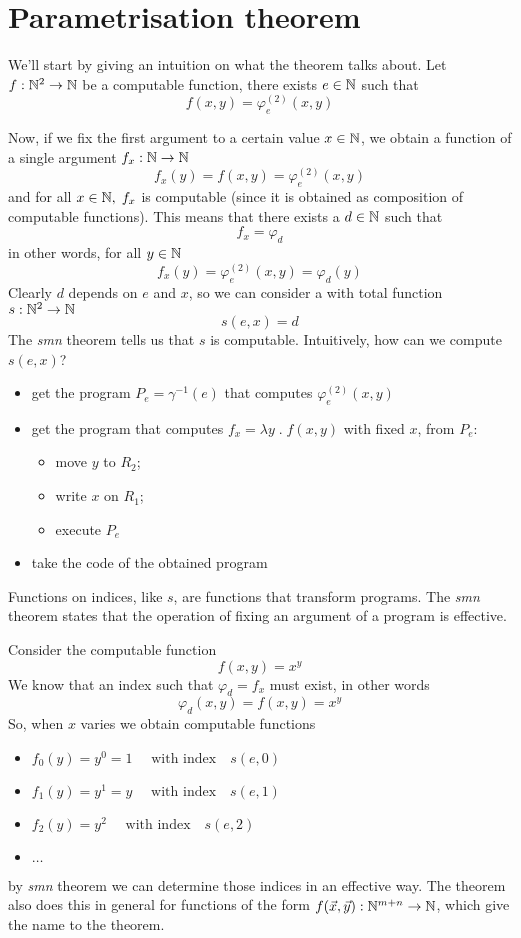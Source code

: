 \chapter {Parametrisation theorem}
\newcommand{\smn}{$S_n^m$}

We'll start by giving an intuition on what the theorem talks
about. Let $f : \mathbb{N}^2 \rightarrow \mathbb{N}$ be a computable
function, there exists $e \in \mathbb{N}$ such that
 \[f(x,y) = \varphi_e^{(2)}(x,y)\]

Now, if we fix the first argument to a certain value $x \in \mathbb{N}$, we obtain a
function of a single argument $f_x : \mathbb{N} \to \mathbb{N}$
\[f_x(y) = f(x,y) = \varphi_e^{(2)}(x,y)\] and for all $ x \in \mathbb{N}, \; f_x$
is computable (since it is obtained as composition of computable
functions). This means that there exists a $d \in \mathbb{N}$ such that
\[f_x = \varphi_d\] in other words, for all $ y \in \mathbb{N}$
\[f_x(y) = \varphi_e^{(2)}(x,y) = \varphi_d(y)\] Clearly $d$
depends on $e$ and $x$, so we can consider a with 
total function $s : \mathbb{N}^2 \rightarrow \mathbb{N}$
\[
  s(e, x) = d
  \]
The \textit{smn} theorem tells us that $s$ is computable. Intuitively,
how can we compute $s(e, x)$?
\begin{itemize}
\item get the program
  $P_e = \gamma^{-1}(e)$ that computes $\varphi_e^{(2)}(x,y)$
\item get the program that computes $f_x = \lambda y \; . \; f(x,y)$ with
  fixed $x$, from $P_e$:
  \begin{itemize}
  \item move $y$ to $R_2$;
  \item write $x$ on $R_1$;
  \item execute $P_e$
  \end{itemize}
\item take the code of the obtained program
\end{itemize}
Functions on indices, like $s$, are functions that
transform programs. The \emph{smn} theorem states that the operation of
fixing an argument of a program is effective.

\begin{example}
  Consider the computable function 
  \[f(x,y) = x^y\]
  We know that an
  index such that \(\varphi_d = f_x\) must exist, in other
  words \[\varphi_d(x,y) = f(x,y) = x^y\] So, when $x$ varies we
  obtain computable functions
  \begin{itemize}
  \item[] \(f_0(y) = y^0 = 1 \quad \mbox{ with index} \quad s(e,0)\)
  \item[] \(f_1(y) = y^1 = y \quad \mbox{ with index} \quad s(e,1)\)
  \item[] \(f_2(y) = y^2  \quad \mbox{ with index} \quad s(e,2)\)
  \item[] \(\dots\)
  \end{itemize}
  by \emph{smn} theorem we can determine those indices in an
  effective way. The theorem also does this in general for functions
  of the form $f(\vec{x}, \vec{y}) : \mathbb{N}^{m+n} \rightarrow \mathbb{N}$,
  which give the name to the theorem.
\end{example}

